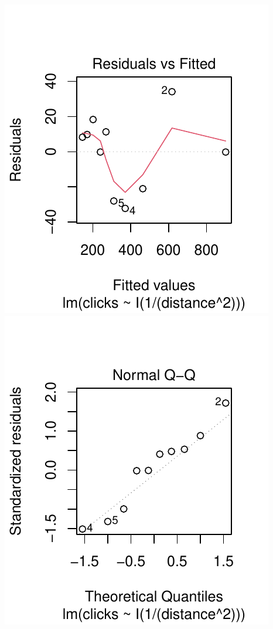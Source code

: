 \documentclass[twoside]{book}\usepackage[]{graphicx}\usepackage[]{xcolor}
\makeatletter
\def\maxwidth{ %
  \ifdim\Gin@nat@width>\linewidth
    \linewidth
  \else
    \Gin@nat@width
  \fi
}
\newenvironment{knitrout}{}{} %
\makeatother
\begin{document}
\begin{problem}
\begin{knitrout}
{\centering \includegraphics[width=\maxwidth]{figures/fig-unnamed-chunk-322-1} 
\includegraphics[width=\maxwidth]{figures/fig-unnamed-chunk-322-2} 

}
\end{knitrout}
\end{problem}
\end{document}
